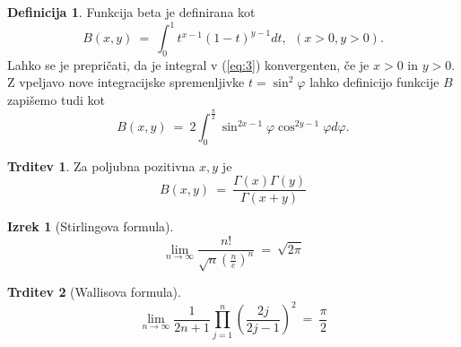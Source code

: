 \documentclass[11pt]{article}
\theoremstyle{definition}
\newtheorem{definicija}{Definicija}[section]
\theoremstyle{definition}
\newtheorem{trditev}{Trditev}[section]
\theoremstyle{definition}
\newtheorem{izrek}{Izrek}[section]
\begin{document}
\begin{definicija}

Funkcija beta je definirana kot
\begin{equation} \label{eq:3}
	B(x, y) ~=~ \int_0^1 t^{x-1} (1-t)^{y-1} dt, ~~(x>0, y>0).
\end{equation}
Lahko se je prepričati, da je integral v (\ref{eq:3}) konvergenten, če je $x > 0$ in $y > 0$. \\

Z vpeljavo nove integracijske spremenljivke $t = \sin^2{\varphi}$ lahko definicijo funkcije $B$ zapišemo tudi kot
\begin{equation} \label{eq:4}
	B(x, y) ~=~ 2 \int_0^{\frac{\pi}{2}} \sin^{2x-1}{\varphi} \cos^{2y-1}{\varphi} d\varphi.
\end{equation}

\end{definicija}
\vspace{0.5cm}

\begin{trditev}

Za poljubna pozitivna $x, y$ je 
\begin{equation} \label{eq:5}
	B(x, y) ~=~ \frac{\Gamma(x)\Gamma(y)}{\Gamma(x+y)}
\end{equation}

\end{trditev}
\vspace{0.5cm} 

\begin{izrek}[Stirlingova formula]

$$\lim_{n \rightarrow \infty} \frac{n!}{\sqrt{n} (\frac{n}{e})^n} ~=~ \sqrt{2 \pi}$$

\end{izrek}
\vspace{0.5cm}

\begin{trditev}[Wallisova formula]

$$\lim_{n \rightarrow \infty} \frac{1}{2n+1} \prod_{j=1}^n \left( \frac{2j}{2j-1} \right)^2 ~=~ \frac{\pi}{2}$$

\end{trditev}
\vspace{0.5cm}


\pagebreak

\end{document}
